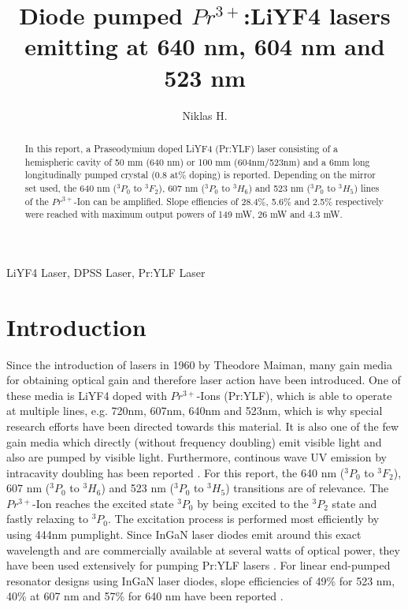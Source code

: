 \documentclass[conference]{IEEEtran}
\begin{document}
\title{Diode pumped $Pr^{3+}$:LiYF4 lasers emitting at 640 nm, 604 nm and 523 nm\\
}

\author{Niklas H.}

\maketitle

\begin{abstract}
In this report, a Praseodymium doped LiYF4 (Pr:YLF) laser consisting of a hemispheric cavity of 50 mm (640 nm) or 100 mm (604nm/523nm) and a 6mm long longitudinally pumped crystal (0.8 at\% doping) is reported. Depending on the mirror set used, the 640 nm ($^3P_0$ to $^3F_2$), 607 nm ($^3P_0$ to $^3H_6$) and 523 nm ($^3P_0$ to $^3H_5$) lines of the $Pr^{3+}$-Ion can be amplified. Slope effiencies of 28.4\%, 5.6\% and 2.5\% respectively were reached with maximum output powers of 149 mW, 26 mW  and 4.3 mW.
\end{abstract}

\begin{IEEEkeywords}
LiYF4 Laser, DPSS Laser, Pr:YLF Laser
\end{IEEEkeywords}
\section{Introduction}

Since the introduction of lasers in 1960 by Theodore Maiman, many gain media for obtaining optical gain and therefore laser action have been introduced. One of these media is LiYF4 doped with $Pr^{3+}$-Ions (Pr:YLF), which is able to operate at multiple lines, e.g. 720nm, 607nm, 640nm and 523nm, which is why special research efforts have been directed towards this material. It is also one of the few gain media which directly (without frequency doubling) emit visible light and also are pumped by visible light. Furthermore, continous wave UV emission by intracavity doubling has been reported \cite{Richter.2006}\cite{Gun.2011}. For this report, the 640 nm ($^3P_0$ to $^3F_2$), 607 nm ($^3P_0$ to $^3H_6$) and 523 nm ($^3P_0$ to $^3H_5$) transitions are of relevance. The $Pr^{3+}$-Ion reaches the excited state $^3P_0$ by being excited to the $^3P_2$ state and fastly relaxing to $^3P_0$. The excitation process is performed most efficiently by using 444nm pumplight. Since InGaN laser diodes emit around this exact wavelength and are commercially available at several watts of optical power, they have been used extensively for pumping Pr:YLF lasers \cite{Xu.2013}\cite{Krankel.2016}\cite{Bellancourt.2010}\cite{Luo.2018}\cite{Muller.2011}. For linear end-pumped resonator designs using InGaN laser diodes, slope efficiencies of 49\% for 523 nm, 40\% at 607 nm and 57\% for 640 nm have been reported \cite{Luo.2016}. 
\end{document}
